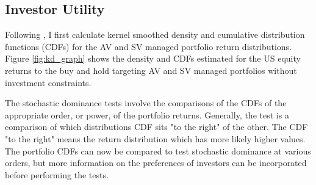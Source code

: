 \subsection{Investor Utility}
Following \citet{vinod_hands-intermediate_2008}, I first calculate kernel smoothed density and cumulative distribution functions (CDFs) for the AV and SV managed portfolio return distributions. Figure \ref{fig:kd_graph} shows the density and CDFs estimated for the US equity returns to the buy and hold targeting AV and SV managed portfolios without investment constraints.
\begin{figure}[htb]
	\centering
	\caption{{\bf These figures show the smoothed kernel smoothed density and empirical CDFs calculated for the returns to the AV and SV managed US equity portfolios. These are examples of the estimated distributions are used in the stochastic dominance tests which follow.}} \label{fig:kd_graph}
	\begin{subfigure}{\textwidth}
		
	\end{subfigure}
	
	\begin{subfigure}{\textwidth}
		
	\end{subfigure}
	
	\begin{subfigure}{\textwidth}
		
	\end{subfigure}
	
	\begin{subfigure}{\textwidth}
		
	\end{subfigure}
\end{figure}
The stochastic dominance tests involve the comparisons of the CDFs of the appropriate order, or power, of the portfolio returns. Generally, the test is a comparison of which distributions CDF sits "to the right" of the other. The CDF "to the right" means the return distribution which has more likely higher values. The portfolio CDFs can now be compared to test stochastic dominance at various orders, but more information on the preferences of investors can be incorporated before performing the tests.


